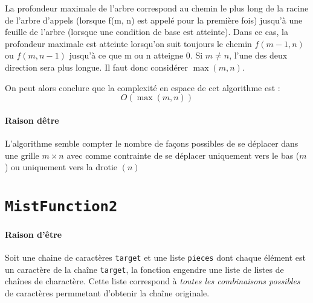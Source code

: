 \documentclass[9pt]{report}
\begin{document}
\begin{multicols*}{2}
  
  La profondeur maximale de l'arbre correspond 
  au chemin le plus long de la racine de l'arbre d'appels (lorsque f(m, n) 
  est appelé pour la première fois) jusqu'à une feuille de l'arbre 
  (lorsque une condition de base est atteinte). 
  Dans ce cas, la profondeur maximale est atteinte lorsqu'on 
  suit toujours le chemin $f(m - 1, n)  $ou $f(m, n - 1)$ jusqu'à
  ce que m ou n atteigne 0. Si $m \neq n$, l'une des deux direction sera plus longue. 
  Il faut donc considérer $\max(m, n)$. 

  On peut alors conclure que la complexité
  en espace de cet algorithme est : 
  \[ O(\max(m, n)) \]


  \paragraph{Raison dêtre}
  L'algorithme semble compter le nombre de façons possibles de se déplacer 
  dans une grille $m \times n$ avec comme contrainte de se déplacer uniquement 
  vers le bas ($m$) ou uniquement vers la drotie $(n)$
  \section{\texttt{MistFunction2}} 
  \paragraph{Raison d'être}
  Soit une chaine de caractères \texttt{target} et une liste 
  \texttt{pieces} dont chaque élément est un caractère de  
  la chaîne \texttt{target}, la fonction engendre une 
  liste de listes de chaînes de charactère. Cette liste correspond 
  à \textit{toutes les combinaisons possibles} de caractères permmetant 
  d'obtenir la chaîne originale. 


\end{multicols*}
\end{document}

